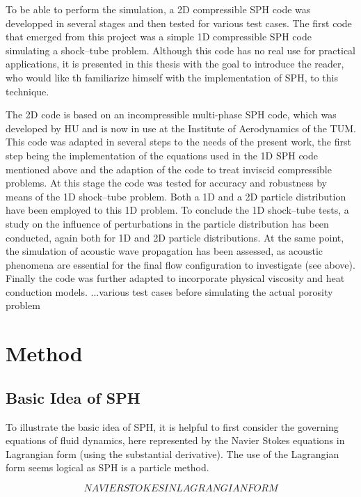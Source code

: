 \documentclass{report}
\begin{document}
To be able to perform the simulation, a 2D compressible SPH code was developped in several stages and then tested for various test cases.
The first code that emerged from this project was a simple 1D compressible SPH code simulating a shock--tube problem. Although this code has no real use for practical applications, it is presented in this thesis with the goal to introduce the reader, who would like th familiarize himself with the implementation of SPH, to this technique.

The 2D code is based on an incompressible multi-phase SPH code, which was developed by HU and is now in use at the Institute of Aerodynamics of the TUM. This code was adapted in several steps to the needs of the present work, the first step being the implementation of the equations used in the 1D SPH code mentioned above and the adaption of the code to treat inviscid compressible problems. At this stage the code was tested for accuracy and robustness
by means of the 1D shock--tube problem. Both a 1D and a 2D particle distribution have been employed to this 1D problem. To conclude the 1D shock--tube tests, a study on the influence of perturbations in the particle distribution has been conducted, again both for 1D and 2D particle distributions.
At the same point, the simulation of acoustic wave propagation has been assessed, as acoustic phenomena are essential for the final flow configuration to investigate (see above).
Finally the code was further adapted to incorporate physical viscosity and heat conduction models.
...various test cases before simulating the actual porosity problem




\chapter{Method}
\label{sec:method}
\section{Basic Idea of SPH}
\label{sec:BasicsSPH}

To illustrate the basic idea of SPH, it is helpful to first consider the
governing equations of fluid dynamics, here represented by the Navier Stokes equations in
Lagrangian form (using the substantial derivative). The use of the Lagrangian form seems logical as SPH is a
particle method.

\begin {equation}
NAVIER STOKES IN LAGRANGIAN FORM
\end {equation}
\end{document}
